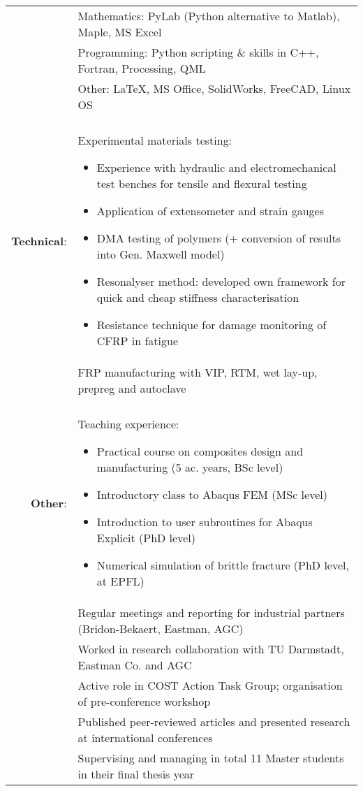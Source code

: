 \documentclass[a4paper,10pt]{article} %
\begin{document}
\begin{tabular}{r p{13.5cm}}
& Mathematics: PyLab (Python alternative to Matlab), Maple, MS Excel \vspace{0.2cm} \\ 

& Programming: Python scripting \& skills in C++, Fortran, Processing, QML \vspace{0.2cm} \\ 

& Other: LaTeX, MS Office, SolidWorks, FreeCAD, Linux OS\\
&\\

\textbf{Technical}: 	& Experimental materials testing:\footnotesize{\begin{itemize}
				\item Experience with hydraulic and electromechanical test benches for tensile and flexural testing
				\item Application of extensometer and strain gauges
				\item DMA testing of polymers (+ conversion of results into Gen. Maxwell model)
				\item Resonalyser method: developed own framework for quick and cheap stiffness characterisation
				\item Resistance technique for damage monitoring of CFRP in fatigue
			\end{itemize}} \\
			& FRP manufacturing with VIP, RTM, wet lay-up, prepreg and autoclave \\
&\\

\textbf{Other}:	& Teaching experience: \footnotesize{\begin{itemize}
			\item Practical course on composites design and manufacturing (5 ac. years, BSc level)
			\item Introductory class to Abaqus FEM (MSc level)
			\item Introduction to user subroutines for Abaqus Explicit (PhD level)
			\item Numerical simulation of brittle fracture (PhD level, at EPFL)
		\end{itemize}} \\ %
	 	& Regular meetings and reporting for industrial partners (Bridon-Bekaert, Eastman, AGC)\vspace{0.2cm} \\ 
		& Worked in research collaboration with TU Darmstadt, Eastman Co. and AGC \vspace{0.2cm} \\ 
		& Active role in COST Action Task Group; organisation of pre-conference workshop\vspace{0.2cm} \\ 
		& Published peer-reviewed articles and presented research at international conferences \vspace{0.2cm} \\ 
		& Supervising and managing in total 11 Master students in their final thesis year \\

\end{tabular}
\end{document}
